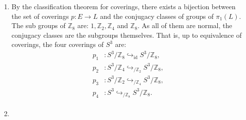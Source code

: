 \documentclass[11pt,a4paper]{article}
\newcommand{\id}{\operatorname{id}}
\newcommand{\Z}{\mathbb Z}
\begin{document}
\begin{enumerate}[label=\alph*)]
    \item By the classification theorem for coverings, there exists a bijection between the set of coverings $p\colon E \to L $ and the conjugacy classes of groups of $ \pi_1(L)$. The sub groups of $ \Z_8 $ are: $1, \Z_2, \Z_4 $ and $ \Z_8$. As all of them are normal, the conjugacy classes are the subgroups themselves. That is, up to equivalence of coverings, the four coverings of $ S^3 $ are:
    \begin{align*}
      p_1 &\colon S^3 / \Z_8 \hookrightarrow_{\id} S^3 / \Z_8, \\
      p_2 &\colon S^3 / \Z_4 \hookrightarrow_{/ \Z_2} S^3 / \Z_8, \\
      p_3 &\colon S^3 / \Z_2 \hookrightarrow_{/ \Z_4} S^3 / \Z_8, \\
      p_4 &\colon S^3 \hookrightarrow_{/ \Z_8} S^3 / \Z_8. \\
    \end{align*}

    \item
  \end{enumerate}
\end{document}
